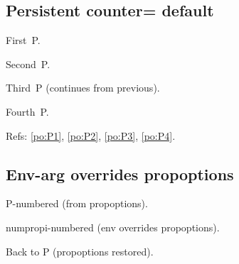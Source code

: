\documentclass{article}
\begin{document}

\subsection{Persistent counter= default}



\begin{prop}
  \item First~P. \label{po:P1}
  \item Second~P. \label{po:P2}
\end{prop}

\begin{prop}
  \item Third~P (continues from previous). \label{po:P3}
  \item Fourth~P. \label{po:P4}
\end{prop}


Refs: \ref{po:P1}, \ref{po:P2}, \ref{po:P3}, \ref{po:P4}.

\subsection{Env-arg overrides propoptions}



\begin{prop}
  \item P-numbered (from propoptions). \label{po:ov1}
\end{prop}
\begin{prop}[counter=numpropi, style=numbered]
  \item numpropi-numbered (env overrides propoptions). \label{po:ov2}
\end{prop}
\begin{prop}
  \item Back to P (propoptions restored). \label{po:ov3}
\end{prop}
\end{document}
